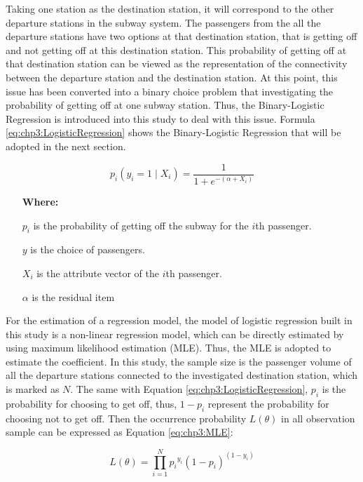 %
Taking one station as the destination station, it will correspond to the other departure stations in the subway system. The passengers from the all the departure stations have two options at that destination station, that is getting off and not getting off at this destination station. This probability of getting off at that destination station can be viewed as the representation of the connectivity between the departure station and the destination station. At this point, this issue has been converted into a binary choice problem that investigating the probability of getting off at one subway station. Thus, the Binary-Logistic Regression is introduced into this study to deal with this issue. Formula \ref{eq:chp3:LogisticRegression} shows the Binary-Logistic Regression that will be adopted in the next section.

\begin{equation}
	p_i(y_i=1 \mid X_i)=\frac{1}{1+e^{-(\alpha +X_i)}}
	\label{eq:chp3:LogisticRegression}
\end{equation}

\begin{enumerate}
	\item[\textbf{Where:}]
	\item[$p_i$] is the probability of getting off the subway for the $i$th passenger.
	\item[$y$] is the choice of passengers.
	\item[$X_i$] is the attribute vector of the $i$th passenger.
	\item[$\alpha$] is the residual item
\end{enumerate}

%
For the estimation of a regression model, the model of logistic regression built in this study is a non-linear regression model, which can be directly estimated by using maximum likelihood estimation (MLE). Thus, the MLE is adopted to estimate the coefficient. In this study, the sample size is the passenger volume of all the departure stations connected to the investigated destination station, which is marked as $N$. The same with Equation \ref{eq:chp3:LogisticRegression}, $p_i$ is the probability for choosing to get off, thus, $1-p_i$ represent the probability for choosing not to get off. Then the occurrence probability $L(\theta)$ in all observation sample can be expressed as Equation \ref{eq:chp3:MLE}:

\begin{equation}
	L(\theta)=\prod_{i=1}^{N}{p_i}^{y_i}(1-p_i)^{(1-y_i)}
	\label{eq:chp3:MLE}
\end{equation}

